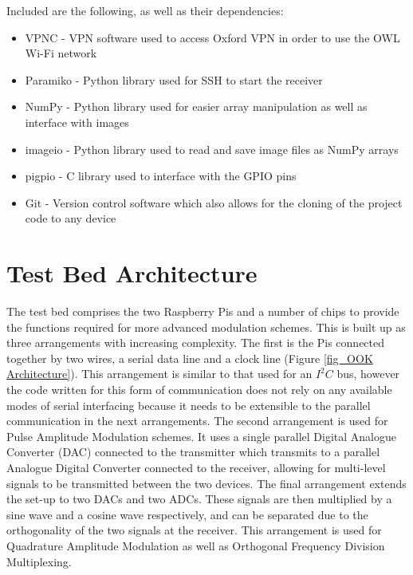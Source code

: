 \documentclass[../main.tex]{subfiles}
\begin{document}
Included are the following, as well as their dependencies:

\begin{itemize}
	\item VPNC - VPN software used to access Oxford VPN in order to use the OWL Wi-Fi network \cite{lib_VPNC}
	\item Paramiko - Python library used for SSH to start the receiver \cite{lib_Paramiko}
	\item NumPy - Python library used for easier array manipulation as well as interface with images \cite{lib_NumPy}
	\item imageio - Python library used to read and save image files as NumPy arrays \cite{lib_imageio}
	\item pigpio - C library used to interface with the GPIO pins \cite{lib_pigpio}
	\item Git - Version control software which also allows for the cloning of the project code to any device \cite{lib_Git}
\end{itemize}

\clearpage

	
\section{Test Bed Architecture}


The test bed comprises the two Raspberry Pis and a number of chips to provide the functions required for more advanced modulation schemes.
This is built up as three arrangements with increasing complexity.
The first is the Pis connected together by two wires, a serial data line and a clock line (Figure \ref{fig_OOK Architecture}).
This arrangement is similar to that used for an $I^2C$ bus, however the code written for this form of communication does not rely on any available modes of serial interfacing because it needs to be extensible to the parallel communication in the next arrangements.
The second arrangement is used for Pulse Amplitude Modulation schemes.
It uses a single parallel Digital Analogue Converter (DAC) connected to the transmitter which transmits to a parallel Analogue Digital Converter connected to the receiver, allowing for multi-level signals to be transmitted between the two devices.
The final arrangement extends the set-up to two DACs and two ADCs.
These signals are then multiplied by a sine wave and a cosine wave respectively, and can be separated due to the orthogonality of the two signals at the receiver.
This arrangement is used for Quadrature Amplitude Modulation as well as Orthogonal Frequency Division Multiplexing.\\
\end{document}
